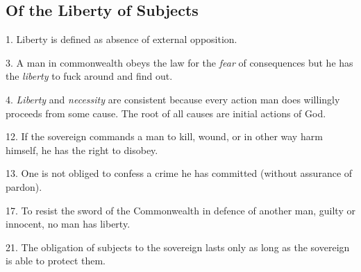 \subsection{Of the Liberty of Subjects}

1. Liberty is defined as absence of external opposition.

3. A man in commonwealth obeys the law for the \textit{fear} of consequences
but he has the \textit{liberty} to fuck around and find out.

4. \textit{Liberty} and \textit{necessity} are consistent because every action
man does willingly proceeds from some cause. The root of all causes are initial
actions of God.

12. If the sovereign commands a man to kill, wound, or in other way harm
himself, he has the right to disobey.

13. One is not obliged to confess a crime he has committed (without assurance
of pardon).

17. To resist the sword of the Commonwealth in defence of another man, guilty
or innocent, no man has liberty.

21. The obligation of subjects to the sovereign lasts only as long as the
sovereign is able to protect them.
